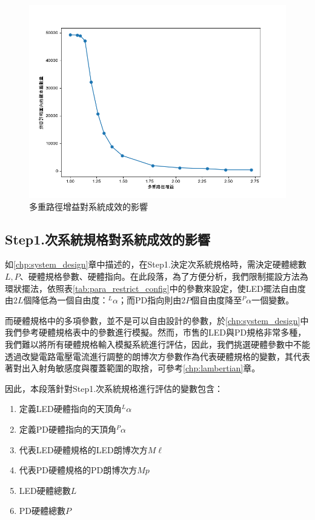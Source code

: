      \begin{figure}[htpb]
        \centering
        \includegraphics[width=15cm]{ch4pic/multipath_effect.png}
        \caption{多重路徑增益對系統成效的影響}
        \label{pic:multipath_effect}
    \end{figure}



\subsection{Step1.次系統規格對系統成效的影響}
\label{chp:design_result}

如\ref{chp:system_design}章中描述的，在Step1.決定次系統規格時，需決定硬體總數$L,P$、硬體規格參數、硬體指向。在此段落，為了方便分析，我們限制擺設方法為環狀擺法，依照表\ref{tab:para_restrict_config}中的參數來設定，使LED擺法自由度由$2L$個降低為一個自由度：$^L\alpha$；而PD指向則由$2P$個自由度降至$^P\alpha$一個變數。

而硬體規格中的多項參數，並不是可以自由設計的參數，於\ref{chp:system_design}中我們參考硬體規格表中的參數進行模擬。然而，市售的LED與PD規格非常多種，我們難以將所有硬體規格輸入模擬系統進行評估，因此，我們挑選硬體參數中不能透過改變電路電壓電流進行調整的朗博次方參數作為代表硬體規格的變數，其代表著對出入射角敏感度與覆蓋範圍的取捨，可參考\ref{chp:lambertian}章。

因此，本段落針對Step1.次系統規格進行評估的變數包含：
\begin{enumerate}
    \item 定義LED硬體指向的天頂角$^L\alpha$
    \item 定義PD硬體指向的天頂角$^P\alpha$
    \item 代表LED硬體規格的LED朗博次方$M\ell$
    \item 代表PD硬體規格的PD朗博次方$Mp$
    \item LED硬體總數$L$
    \item PD硬體總數$P$

\end{enumerate}

